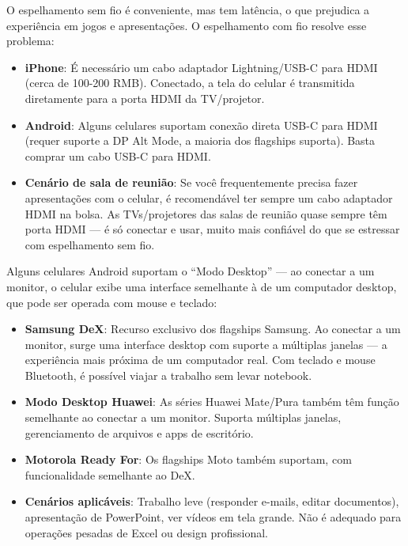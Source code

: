 
O espelhamento sem fio é conveniente, mas tem latência, o que prejudica a experiência em jogos e apresentações. O espelhamento com fio resolve esse problema:

\begin{itemize}
  \item \textbf{iPhone}: É necessário um cabo adaptador Lightning/USB-C para HDMI (cerca de 100-200 RMB). Conectado, a tela do celular é transmitida diretamente para a porta HDMI da TV/projetor.
  \item \textbf{Android}: Alguns celulares suportam conexão direta USB-C para HDMI (requer suporte a DP Alt Mode, a maioria dos flagships suporta). Basta comprar um cabo USB-C para HDMI.
  \item \textbf{Cenário de sala de reunião}: Se você frequentemente precisa fazer apresentações com o celular, é recomendável ter sempre um cabo adaptador HDMI na bolsa. As TVs/projetores das salas de reunião quase sempre têm porta HDMI — é só conectar e usar, muito mais confiável do que se estressar com espelhamento sem fio.
\end{itemize}


Alguns celulares Android suportam o “Modo Desktop” — ao conectar a um monitor, o celular exibe uma interface semelhante à de um computador desktop, que pode ser operada com mouse e teclado:

\begin{itemize}
  \item \textbf{Samsung DeX}: Recurso exclusivo dos flagships Samsung. Ao conectar a um monitor, surge uma interface desktop com suporte a múltiplas janelas — a experiência mais próxima de um computador real. Com teclado e mouse Bluetooth, é possível viajar a trabalho sem levar notebook.
  \item \textbf{Modo Desktop Huawei}: As séries Huawei Mate/Pura também têm função semelhante ao conectar a um monitor. Suporta múltiplas janelas, gerenciamento de arquivos e apps de escritório.
  \item \textbf{Motorola Ready For}: Os flagships Moto também suportam, com funcionalidade semelhante ao DeX.
  \item \textbf{Cenários aplicáveis}: Trabalho leve (responder e-mails, editar documentos), apresentação de PowerPoint, ver vídeos em tela grande. Não é adequado para operações pesadas de Excel ou design profissional.
\end{itemize}

